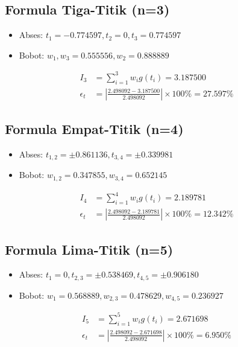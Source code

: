 \documentclass[conference]{IEEEtran}
\begin{document}
\subsection{Formula Tiga-Titik (n=3)}
\begin{itemize}
    \item Abses: $t_1 = -0.774597, t_2 = 0, t_3 = 0.774597$
    \item Bobot: $w_1, w_3 = 0.555556, w_2 = 0.888889$
\end{itemize}
\begin{align*}
    I_3 &= \sum_{i=1}^{3} w_i g(t_i) = \mathbf{3.187500} \\
    \epsilon_t &= \left| \frac{2.498092 - 3.187500}{2.498092} \right| \times 100\% = \mathbf{27.597\%}
\end{align*}

\subsection{Formula Empat-Titik (n=4)}
\begin{itemize}
    \item Abses: $t_{1,2} = \pm 0.861136, t_{3,4} = \pm 0.339981$
    \item Bobot: $w_{1,2} = 0.347855, w_{3,4} = 0.652145$
\end{itemize}
\begin{align*}
    I_4 &= \sum_{i=1}^{4} w_i g(t_i) = \mathbf{2.189781} \\
    \epsilon_t &= \left| \frac{2.498092 - 2.189781}{2.498092} \right| \times 100\% = \mathbf{12.342\%}
\end{align*}

\subsection{Formula Lima-Titik (n=5)}
\begin{itemize}
    \item Abses: $t_1=0, t_{2,3}=\pm0.538469, t_{4,5}=\pm0.906180$
    \item Bobot: $w_1=0.568889, w_{2,3}=0.478629, w_{4,5}=0.236927$
\end{itemize}
\begin{align*}
    I_5 &= \sum_{i=1}^{5} w_i g(t_i) = \mathbf{2.671698} \\
    \epsilon_t &= \left| \frac{2.498092 - 2.671698}{2.498092} \right| \times 100\% = \mathbf{6.950\%}
\end{align*}
\end{document}
